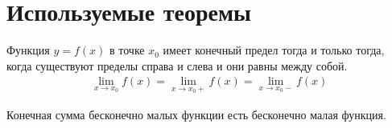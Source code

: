 \newpage
\section{Используемые теоремы}

\begin{theorem}
  Функция $y = f(x)$ в точке  $x_0$ имеет конечный предел тогда и только тогда, когда существуют пределы справа и слева и они равны между собой.
  \begin{gather*}
    \lim_{x \to x_0} f(x) = \lim_{x \to x_0+} f(x) = \lim_{x \to x_0-} f(x) 
  \end{gather*}
\end{theorem}

\begin{theorem} 
  Конечная сумма бесконечно малых функции есть бесконечно малая функция.
\end{theorem}

